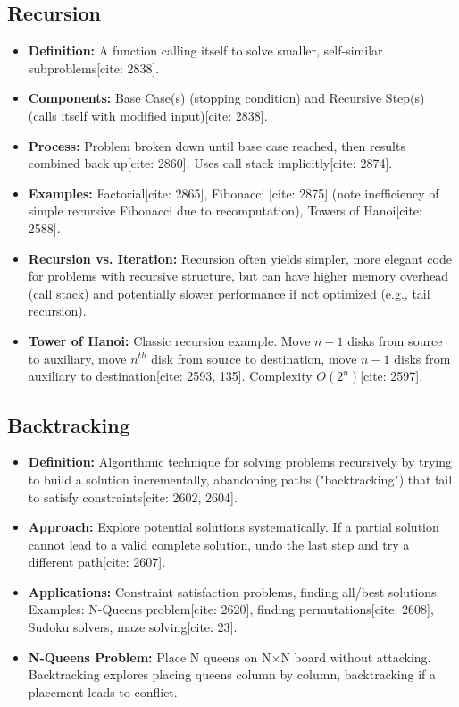 \documentclass{article}
\begin{document}
\subsection{Recursion}
\begin{itemize}
    \item \textbf{Definition:} A function calling itself to solve smaller, self-similar subproblems[cite: 2838].
    \item \textbf{Components:} Base Case(s) (stopping condition) and Recursive Step(s) (calls itself with modified input)[cite: 2838].
    \item \textbf{Process:} Problem broken down until base case reached, then results combined back up[cite: 2860]. Uses call stack implicitly[cite: 2874].
    \item \textbf{Examples:} Factorial[cite: 2865], Fibonacci [cite: 2875] (note inefficiency of simple recursive Fibonacci due to recomputation), Towers of Hanoi[cite: 2588].
    \item \textbf{Recursion vs. Iteration:} Recursion often yields simpler, more elegant code for problems with recursive structure, but can have higher memory overhead (call stack) and potentially slower performance if not optimized (e.g., tail recursion).
    \item \textbf{Tower of Hanoi:} Classic recursion example. Move $n-1$ disks from source to auxiliary, move $n^{th}$ disk from source to destination, move $n-1$ disks from auxiliary to destination[cite: 2593, 135]. Complexity $O(2^n)$[cite: 2597].
\end{itemize}

\subsection{Backtracking}
\begin{itemize}
    \item \textbf{Definition:} Algorithmic technique for solving problems recursively by trying to build a solution incrementally, abandoning paths ("backtracking") that fail to satisfy constraints[cite: 2602, 2604].
    \item \textbf{Approach:} Explore potential solutions systematically. If a partial solution cannot lead to a valid complete solution, undo the last step and try a different path[cite: 2607].
    \item \textbf{Applications:} Constraint satisfaction problems, finding all/best solutions. Examples: N-Queens problem[cite: 2620], finding permutations[cite: 2608], Sudoku solvers, maze solving[cite: 23].
    \item \textbf{N-Queens Problem:} Place N queens on N$\times$N board without attacking. Backtracking explores placing queens column by column, backtracking if a placement leads to conflict.
\end{itemize}
\end{document}
